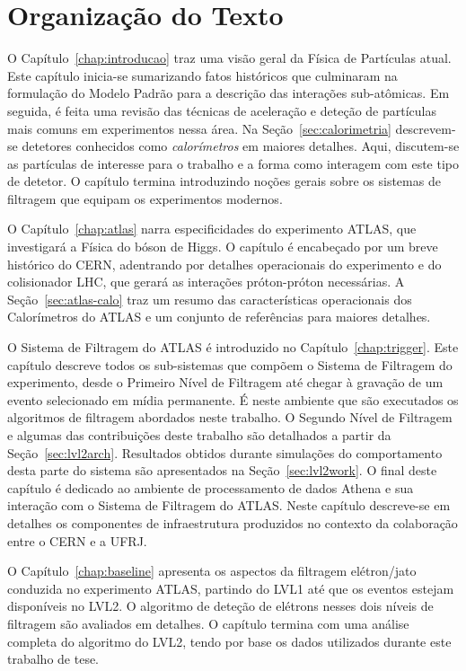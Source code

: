 \section{Organização do Texto}

O Capítulo~\ref{chap:introducao} traz uma visão geral da Física de Partículas
atual. Este capítulo inicia-se sumarizando fatos históricos que culminaram na
formulação do Modelo Padrão para a descrição das interações sub-atômicas. Em
seguida, é feita uma revisão das técnicas de aceleração e deteção de
partículas mais comuns em experimentos nessa área. Na
Seção~\ref{sec:calorimetria} descrevem-se detetores conhecidos como
\textit{calorímetros} em maiores detalhes. Aqui, discutem-se as partículas de
interesse para o trabalho e a forma como interagem com este tipo de detetor. O
capítulo termina introduzindo noções gerais sobre os sistemas de filtragem que
equipam os experimentos modernos.

O Capítulo~\ref{chap:atlas} narra especificidades do experimento ATLAS, que
investigará a Física do bóson de Higgs. O capítulo é encabeçado por um breve
histórico do CERN, adentrando por detalhes operacionais do experimento e do
colisionador LHC, que gerará as interações próton-próton necessárias. A
Seção~\ref{sec:atlas-calo} traz um resumo das características operacionais dos
Calorímetros do ATLAS e um conjunto de referências para maiores detalhes.

O Sistema de Filtragem do ATLAS é introduzido no
Capítulo~\ref{chap:trigger}. Este capítulo descreve todos os sub-sistemas que
compõem o Sistema de Filtragem do experimento, desde o Primeiro Nível de
Filtragem até chegar à gravação de um evento selecionado em mídia
permanente. É neste ambiente que são executados os algoritmos de filtragem
abordados neste trabalho. O Segundo Nível de Filtragem e algumas das
contribuições deste trabalho são detalhados a partir da
Seção~\ref{sec:lvl2arch}. Resultados obtidos durante simulações do
comportamento desta parte do sistema são apresentados na
Seção~\ref{sec:lvl2work}. O final deste capítulo é dedicado ao ambiente de
processamento de dados Athena e sua interação com o Sistema de Filtragem do
ATLAS. Neste capítulo descreve-se em detalhes os componentes de infraestrutura
produzidos no contexto da colaboração entre o CERN e a UFRJ.

O Capítulo~\ref{chap:baseline} apresenta os aspectos da filtragem elétron/jato
conduzida no experimento ATLAS, partindo do LVL1 até que os eventos estejam
disponíveis no LVL2. O algoritmo de deteção de elétrons nesses dois níveis de
filtragem são avaliados em detalhes. O capítulo termina com uma análise
completa do algoritmo do LVL2, tendo por base os dados utilizados durante este
trabalho de tese.

